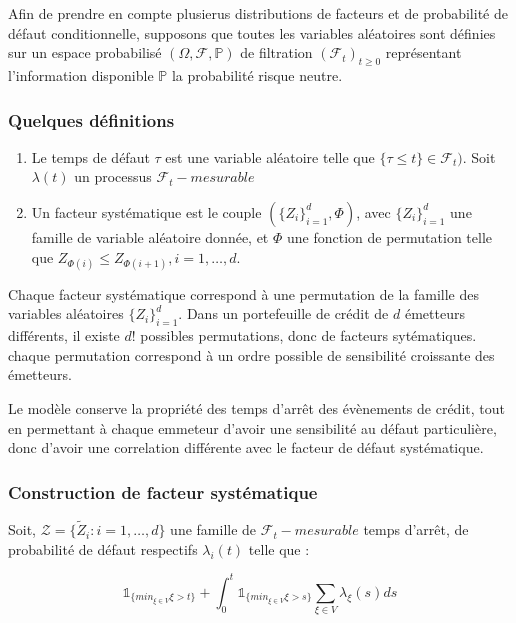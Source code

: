 \documentclass[10pt,a4paper]{article}
\begin{document}
	Afin de prendre en compte plusierus distributions de facteurs et de probabilité de défaut conditionnelle, supposons que toutes les variables aléatoires sont définies sur un espace probabilisé $ (\Omega,\mathcal{F},\mathbb{P}) $ de filtration   $ (\mathcal{F}_t)_{t\geq0} $ représentant l'information disponible $ \mathbb{P} $ la probabilité risque neutre.
	
	\subsubsection*{Quelques définitions}
	
	\begin{enumerate}
		
		\item Le temps de défaut $ \tau $ est une variable aléatoire telle que $ \{ \tau \leq t\} \in \mathcal{F}_t)$.
		Soit $ \lambda(t) $  un processus $ \mathcal{F}_t-mesurable $
		
		\item Un facteur systématique est le couple $ (\{ Z_i\}_{i=1}^{d}, \varPhi ) $, avec $ \{ Z_i\}_{i=1}^d $ une famille de variable aléatoire donnée, et $ \varPhi $ une fonction de permutation telle que 
		$  Z_{\varPhi(i)} \leq Z_{\varPhi(i+1)}, i=1,\ldots,d $.
	
	\end{enumerate}
	
	Chaque facteur systématique correspond à une permutation de la famille des variables aléatoires $ \{ Z_i\}_{i=1}^d $. Dans un portefeuille de crédit de $ d $ émetteurs différents, il existe $ d! $ possibles permutations, donc de facteurs sytématiques. chaque permutation correspond à un ordre possible de sensibilité croissante des émetteurs. 
	
	Le modèle conserve la propriété des temps d'arrêt des évènements de crédit, tout en permettant à chaque emmeteur d'avoir une sensibilité au défaut particulière, donc d'avoir une correlation différente avec le facteur de défaut systématique.
	
\subsubsection*{Construction de facteur systématique}
	
	Soit, $ \mathcal{Z}  = \{ \tilde{Z}_i : i = 1,\ldots,d\} $ une famille de $ \mathcal{F}_t-mesurable $ temps d'arrêt, de probabilité de défaut respectifs $ \lambda_i(t) $ telle que :
	
	$$ \mathds{1}_{ \{ min_{ \xi \in V } \xi > t \} } + \int_0^{t} \mathds{1}_{ \{ min_{ \xi \in V } \xi > s \} } \sum_{\xi \in V} \lambda_\xi(s) ds $$
	
\end{document}
